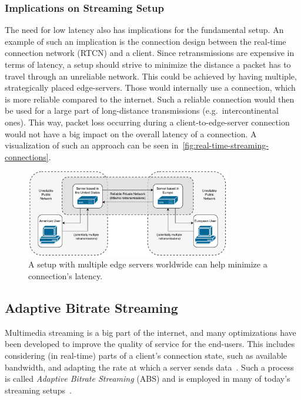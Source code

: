 \subsubsection{Implications on Streaming Setup}
The need for low latency also has implications for the fundamental setup.
An example of such an implication is the connection design between the 
real-time connection network (RTCN) and a client.
Since retransmissions are expensive in terms of latency, a setup should strive to minimize 
the distance a packet has to travel through an unreliable network.
This could be achieved by having multiple, strategically placed edge-servers.
Those would internally use a connection, which is more reliable compared to the internet.
Such a reliable connection would then be used for a large part of long-distance transmissions
(e.g.~intercontinental ones).
This way, packet loss occurring during a client-to-edge-server connection would not have a big 
impact on the overall latency of a connection.
A visualization of such an approach can be seen in~\autoref{fig:real-time-streaming-connections}.

\vspace{0.5cm}
\begin{figure}[H]
    \centering
    \includegraphics[width=0.8\textwidth]{figures/02_background/real-time-streaming-connections.drawio.pdf}
    \caption[Real-time streaming connections]{A setup with multiple edge servers worldwide can help minimize a connection's latency.}\label{fig:real-time-streaming-connections}
\end{figure}

\subsection{Adaptive Bitrate Streaming}\label{subsec:adaptive_bitrate_streaming}
Multimedia streaming is a big part of the internet, and many optimizations have
been developed to improve the quality of service for the end-users.
This includes considering (in real-time) parts of a client's connection state, 
such as available bandwidth, and adapting the rate at which a server sends 
data~\parencite{cloudflare-what-is-adaptive-bitrate-streaming,imagekit-adaptive-bitrate-streaming}.
Such a process is called \textit{Adaptive Bitrate Streaming} (ABS) and is employed in many 
of today's streaming setups~\parencite{netflix-optimizing-stream-experience}.

